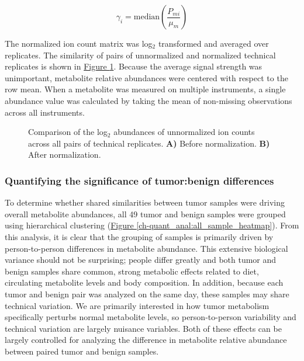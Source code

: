 \begin{equation}
\gamma_{i} = \text{median}\left(\frac{P_{mi}}{\mu_{m}}\right)
\label{ch-quant_anal:normal}
\end{equation}

The normalized ion count matrix was log$_{2}$ transformed and averaged over replicates.  The similarity of pairs of unnormalized and normalized technical replicates is shown in \hyperref[ch-quant_anal:replicate_corr]{Figure \ref{ch-quant_anal:replicate_corr}}.  Because the average signal strength was unimportant, metabolite relative abundances were centered with respect to the row mean.  When a metabolite was measured on multiple instruments, a single abundance value was calculated by taking the mean of non-missing observations across all instruments.

\begin{figure}[h!]
\begin{center}
\hspace{1mm}

\caption[Comparison of the log$_{2}$ abundances of unnormalized ion counts for pairs of technical replicates]{Comparison of the log$_{2}$ abundances of unnormalized ion counts across all pairs of technical replicates.  \textbf{A)} Before normalization. \textbf{B)} After normalization.}
\label{ch-quant_anal:replicate_corr}
\end{center}
\end{figure}

\subsubsection{Quantifying the significance of tumor:benign differences}

To determine whether shared similarities between tumor samples were driving overall metabolite abundances, all 49 tumor and benign samples were grouped using hierarchical clustering (\hyperref[ch-quant_anal:all_sample_heatmap]{Figure \ref{ch-quant_anal:all_sample_heatmap}}). From this analysis, it is clear that the grouping of samples is primarily driven by person-to-person differences in metabolite abundance.  This extensive biological variance should not be surprising; people differ greatly and both tumor and benign samples share common, strong metabolic effects related to diet, circulating metabolite levels and body composition.  In addition, because each tumor and benign pair was analyzed on the same day, these samples may share technical variation.  We are primarily interested in how tumor metabolism specifically perturbs normal metabolite levels, so person-to-person variability and technical variation are largely nuisance variables. Both of these effects can be largely controlled for analyzing the difference in metabolite relative abundance between paired tumor and benign samples. 

